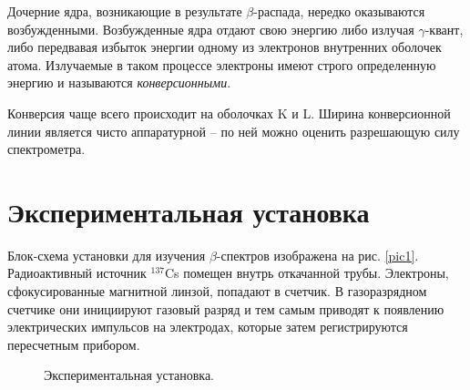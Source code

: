 \documentclass[a4paper,12pt]{article} %
\begin{document}
	Дочерние ядра, возникающие в результате $\beta$-распада, нередко оказываются возбужденными. Возбужденные ядра отдают свою энергию либо излучая $\gamma$-квант, либо передвавая избыток энергии одному из электронов внутренних оболочек атома. Излучаемые в таком процессе электроны имеют строго определенную энергию и называются \textit{конверсионными}.
	
	Конверсия чаще всего происходит на оболочках K и L. Ширина конверсионной линии является чисто аппаратурной -- по ней можно оценить разрешающую силу спектрометра.
	
\newpage
\section{Экспериментальная установка}
	Блок-схема установки для изучения $\beta$-спектров изображена на рис. \ref{pic1}. Радиоактивный источник $^{137}$Cs помещен внутрь откачанной трубы. Электроны, сфокусированные магнитной линзой, попадают в счетчик. В газоразрядном счетчике они инициируют газовый разряд и тем самым приводят к появлению электрических импульсов на электродах, которые затем регистрируются пересчетным прибором.
	
	
	\begin{figure}[h!]
		{\caption{Экспериментальная установка.}}
	\end{figure}
\end{document}
